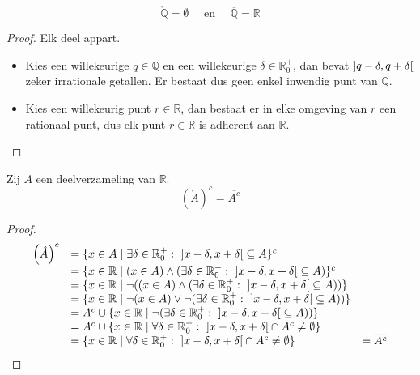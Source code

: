 \documentclass[main.tex]{subfiles}
\begin{document}
\begin{pr}
  \[ \mathring{\mathbb{Q}} = \emptyset \quad\text{ en }\quad \overline{\mathbb{Q}} = \mathbb{R} \]

  \begin{proof}
    Elk deel appart.
    \begin{itemize}
    \item Kies een willekeurige $q\in \mathbb{Q}$ en een willekeurige $\delta \in \mathbb{R}_{0}^{+}$, dan bevat $\interval[open]{q-\delta}{q+\delta}$ zeker irrationale getallen.\waarom
      Er bestaat dus geen enkel inwendig punt van $\mathbb{Q}$.
    \item Kies een willekeurig punt $r \in \mathbb{R}$, dan bestaat er in elke omgeving van $r$ een rationaal punt, dus elk punt $r\in \mathbb{R}$ is adherent aan $\mathbb{R}$.
    \end{itemize}
  \end{proof}
\end{pr}


\begin{st}
  Zij $A$ een deelverzameling van $\mathbb{R}$.
  \[ \left(\mathring{A}\right)^{c} = \overline{A^{c}} \]
  
  \begin{proof}
    \[
    \begin{array}{rll}
      \left(\mathring{A}\right)^{c}
      &= \{ x\in A\mid \exists \delta \in \mathbb{R}_{0}^{+}:\ \interval[open]{x-\delta}{x+\delta} \subseteq A \}^{c}\\
      &= \{ x\in \mathbb{R}\mid (x\in A) \wedge (\exists \delta \in \mathbb{R}_{0}^{+}:\ \interval[open]{x-\delta}{x+\delta} \subseteq A) \}^{c}\\
      &= \{ x\in \mathbb{R}\mid \neg((x\in A) \wedge (\exists \delta \in \mathbb{R}_{0}^{+}:\ \interval[open]{x-\delta}{x+\delta} \subseteq A)) \}\\
      &= \{ x\in \mathbb{R}\mid \neg(x\in A) \vee \neg(\exists \delta \in \mathbb{R}_{0}^{+}:\ \interval[open]{x-\delta}{x+\delta} \subseteq A)) \}\\
      &= A^{c} \cup \{ x\in \mathbb{R} \mid \neg(\exists \delta \in \mathbb{R}_{0}^{+}:\ \interval[open]{x-\delta}{x+\delta} \subseteq A)) \}\\
      &= A^{c} \cup \{ x\in \mathbb{R} \mid \forall \delta \in \mathbb{R}_{0}^{+}:\ \interval[open]{x-\delta}{x+\delta} \cap A^{c} \neq \emptyset \} \\
      &= \{ x\in \mathbb{R} \mid \forall \delta \in \mathbb{R}_{0}^{+}:\ \interval[open]{x-\delta}{ x+\delta} \cap A^{c} \neq \emptyset \}
      &= \overline{A^{c}}\\
    \end{array}
    \]
  \end{proof}
\feed
\end{st}
\end{document}
